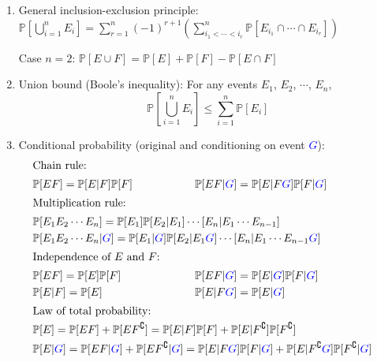 \documentclass{article}
\begin{document}
\begin{enumerate}
	\item General inclusion-exclusion principle: $\displaystyle\mathbb{P}\left[\bigcup_{i=1}^n E_i\right]=\sum_{r=1}^{n}(-1)^{r+1}\left(\sum_{i_1<\cdots<i_r}^{n}\mathbb{P}[E_{i_1}\cap\cdots\cap E_{i_r}]\right)$ 
		
		Case $n=2$: $\mathbb{P}[E\cup F]=\mathbb{P}[E]+\mathbb{P}[F]-\mathbb{P}[E\cap F]$
	
	\item Union bound (Boole's inequality): For any events $E_1$, $E_2$, $\cdots$, $E_n$,
		$$\displaystyle\mathbb{P}\left[\bigcup_{i=1}^n E_i\right]\leq\sum_{i=1}^{n}\mathbb{P}[E_i]$$
		
	\item Conditional probability (original and conditioning on event \textcolor{blue}{$G$}):
		\vspace*{-\baselineskip}
		\begin{align*}
			\intertext{Chain rule:}
			&\mathbb{P}[EF]=\mathbb{P}[E|F]\mathbb{P}[F] &&\hspace*{-6cm}\mathbb{P}[EF|\textcolor{blue}{G}]=\mathbb{P}[E|F\textcolor{blue}{G}]\mathbb{P}[F|\textcolor{blue}{G}] \\
			\intertext{Multiplication rule:}
			&\mathbb{P}[E_1E_2\cdots E_n]=\mathbb{P}[E_1]\mathbb{P}[E_2|E_1]\cdots\mathbb[E_n|E_1\cdots E_{n-1}] && \\
			&\mathbb{P}[E_1E_2\cdots E_n|\textcolor{blue}{G}]=\mathbb{P}[E_1|\textcolor{blue}{G}]\mathbb{P}[E_2|E_1\textcolor{blue}{G}]\cdots\mathbb[E_n|E_1\cdots E_{n-1}\textcolor{blue}{G}] && \\
			\intertext{Independence of $E$ and $F$:}
			&\mathbb{P}[EF]=\mathbb{P}[E]\mathbb{P}[F] &&\hspace*{-6cm}\mathbb{P}[EF|\textcolor{blue}{G}]=\mathbb{P}[E|\textcolor{blue}{G}]\mathbb{P}[F|\textcolor{blue}{G}] \\
			&\mathbb{P}[E|F]=\mathbb{P}[E] &&\hspace*{-6cm}\mathbb{P}[E|F\textcolor{blue}{G}]=\mathbb{P}[E|\textcolor{blue}{G}] \\
			\intertext{Law of total probability:}
			&\mathbb{P}[E]=\mathbb{P}[EF]+\mathbb{P}[EF^\complement]=\mathbb{P}[E|F]\mathbb{P}[F]+\mathbb{P}[E|F^\complement]\mathbb{P}[F^\complement] && \\
			&\mathbb{P}[E|\textcolor{blue}{G}]=\mathbb{P}[EF|\textcolor{blue}{G}]+\mathbb{P}[EF^\complement|\textcolor{blue}{G}]=\mathbb{P}[E|F\textcolor{blue}{G}]\mathbb{P}[F|\textcolor{blue}{G}]+\mathbb{P}[E|F^\complement\textcolor{blue}{G}]\mathbb{P}[F^\complement|\textcolor{blue}{G}] && \\

\end{align*}
\end{enumerate}
\end{document}
